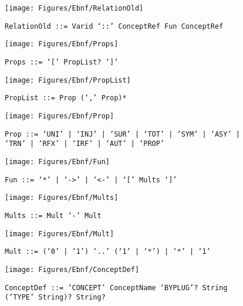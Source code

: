  \begin{figure}[H]
  \centering
  \texttt{[image: Figures/Ebnf/RelationOld]}
  \caption*{\texttt{RelationOld \small::=  Varid `::' ConceptRef Fun ConceptRef}}
  \label{fig:ebnf-RelationOld}
 \end{figure}

 \begin{figure}[H]
  \centering
  \texttt{[image: Figures/Ebnf/Props]}
  \caption*{\texttt{Props \small::=  `[' PropList? `]'}}
  \label{fig:ebnf-Props}
 \end{figure}

 \begin{figure}[H]
  \centering
  \texttt{[image: Figures/Ebnf/PropList]}
  \caption*{\texttt{PropList \small::=  Prop (`,' Prop)*}}
  \label{fig:ebnf-PropList}
 \end{figure}

 \begin{figure}[H]
  \centering
  \texttt{[image: Figures/Ebnf/Prop]}
  \caption*{\texttt{Prop \small::=  `UNI' | `INJ' | `SUR' | `TOT' | `SYM' | `ASY' | `TRN' | `RFX' | `IRF' | `AUT' | `PROP'}}
  \label{fig:ebnf-Prop}
 \end{figure}

 \begin{figure}[H]
  \centering
  \texttt{[image: Figures/Ebnf/Fun]}
  \caption*{\texttt{Fun \small::=  `*' | `->' | `<-' | `[' Mults `]'}}
  \label{fig:ebnf-Fun}
 \end{figure}

 \begin{figure}[H]
  \centering
  \texttt{[image: Figures/Ebnf/Mults]}
  \caption*{\texttt{Mults \small::=  Mult `-' Mult}}
  \label{fig:ebnf-Mults}
 \end{figure}

 \begin{figure}[H]
  \centering
  \texttt{[image: Figures/Ebnf/Mult]}
  \caption*{\texttt{Mult \small::=  (`0' | `1') `..' (`1' | `*') | `*' | `1'}}
  \label{fig:ebnf-Mult}
 \end{figure}

 \begin{figure}[H]
  \centering
  \texttt{[image: Figures/Ebnf/ConceptDef]}
  \caption*{\texttt{ConceptDef \small::=  `CONCEPT' ConceptName `BYPLUG'? String (`TYPE' String)? String?}}
  \label{fig:ebnf-ConceptDef}
 \end{figure}

